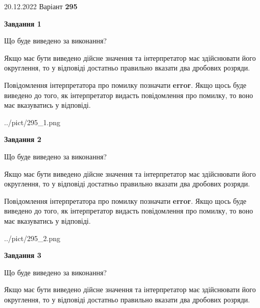 \documentclass[12pt, ukrainian]{article}
\begin{document}
{20.12.2022 Варіант \No \textbf { 295 }\par}
{
\begin {Large}

{\begin {center}\textbf{Завдання 1}\end {center}}\par
Що буде виведено за виконання? \par

Якщо має бути виведено дійсне значення та інтерпретатор має здійснювати його округлення, 
то у відповіді достатньо правильно вказати два дробових розряди.

Повідомлення інтерпретатора про помилку позначати \textbf{error}.
Якщо щось буде виведено до того, як інтерпретатор видасть повідомлення про помилку, 
то воно має вказуватись у відповіді. \par

\begin{center}
	{../pict/295_1.png}
\end{center}
\newpage

{\begin {center}\textbf{Завдання 2}\end {center}}\par
Що буде виведено за виконання? \par

Якщо має бути виведено дійсне значення та інтерпретатор має здійснювати його округлення, 
то у відповіді достатньо правильно вказати два дробових розряди.

Повідомлення інтерпретатора про помилку позначати \textbf{error}.
Якщо щось буде виведено до того, як інтерпретатор видасть повідомлення про помилку, 
то воно має вказуватись у відповіді. \par

\begin{center}
	{../pict/295_2.png}
\end{center}
\newpage

{\begin {center}\textbf{Завдання 3}\end {center}}\par
Що буде виведено за виконання? \par

Якщо має бути виведено дійсне значення та інтерпретатор має здійснювати його округлення, 
то у відповіді достатньо правильно вказати два дробових розряди.


\end{Large}}
\end{document}

